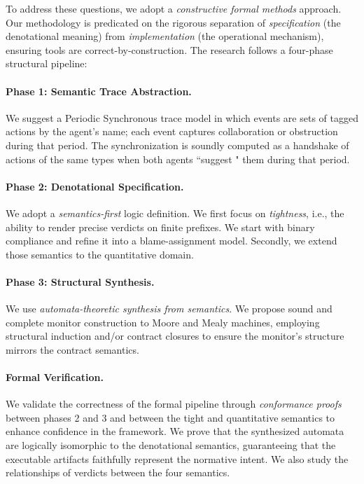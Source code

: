 To address these questions, we adopt a \emph{constructive formal methods} approach. Our methodology is predicated on the rigorous separation of \emph{specification} (the denotational meaning) from \emph{implementation} (the operational mechanism), ensuring tools are correct-by-construction. The research follows a four-phase structural pipeline:



\paragraph{Phase 1: Semantic Trace Abstraction.}
We suggest a Periodic Synchronous trace model in which events are sets of tagged actions by the agent's name; each event captures collaboration or obstruction during that period. The synchronization is soundly computed as a handshake of actions of the same types when both agents ``suggest " them during that period.
\paragraph{Phase 2: Denotational Specification.}
We adopt a \emph{semantics-first} logic definition. We first focus on \emph{tightness}, i.e., the ability to render precise verdicts on finite prefixes. We start with binary compliance and refine it into a blame-assignment model. Secondly, we extend those semantics to the quantitative domain.
\paragraph{Phase 3: Structural Synthesis.}
We use \emph{automata-theoretic synthesis from semantics}. We propose sound and complete monitor construction to Moore and Mealy machines, employing structural induction and/or contract closures to ensure the monitor's structure mirrors the contract semantics.
\paragraph{Formal Verification.}
We validate the correctness of the formal pipeline through \emph{conformance proofs} between phases 2 and 3 and between the tight and quantitative semantics to enhance confidence in the framework. We prove that the synthesized automata are logically isomorphic to the denotational semantics, guaranteeing that the executable artifacts faithfully represent the normative intent. We also study the relationships of verdicts between the four semantics.
